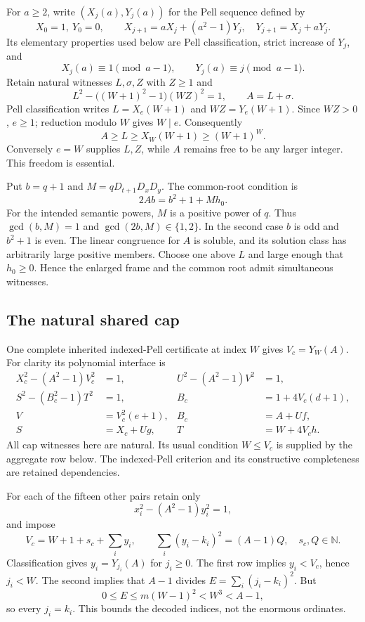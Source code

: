 For $a\ge2$, write $(X_j(a),Y_j(a))$ for the Pell sequence defined by
\[
 X_0=1,\ Y_0=0,\qquad
 X_{j+1}=aX_j+(a^2-1)Y_j,\quad Y_{j+1}=X_j+aY_j.
\]
Its elementary properties used below are Pell classification,
strict increase of $Y_j$, and
\[
 X_j(a)\equiv1\pmod{a-1},\qquad
 Y_j(a)\equiv j\pmod{a-1}.
\]
Retain natural witnesses $L,\sigma,Z$ with $Z\ge1$ and
\begin{equation}
 L^2-\bigl((W+1)^2-1\bigr)(WZ)^2=1,
 \qquad A=L+\sigma.
 \label{eq:direct-large-base}
\end{equation}
Pell classification writes $L=X_e(W+1)$ and $WZ=Y_e(W+1)$.
Since $WZ>0$, $e\ge1$; reduction modulo $W$ gives $W\mid e$.
Consequently
\[
 A\ge L\ge X_W(W+1)\ge(W+1)^W.
\]
Conversely $e=W$ supplies $L,Z$, while $A$ remains free to be any
larger integer. This freedom is essential.

Put $b=q+1$ and $M=qD_{t+1}D_xD_y$. The common-root condition is
\begin{equation}
 2Ab=b^2+1+Mh_0.
 \label{eq:direct-common-root}
\end{equation}
For the intended semantic powers, $M$ is a positive power of $q$.
Thus $\gcd(b,M)=1$ and $\gcd(2b,M)\in\{1,2\}$. In the second case
$b$ is odd and $b^2+1$ is even. The linear congruence for $A$ is
soluble, and its solution class has arbitrarily large positive members.
Choose one above $L$ and large enough that $h_0\ge0$. Hence the
enlarged frame and the common root admit simultaneous witnesses.

\subsection{The natural shared cap}

One complete inherited indexed-Pell certificate at index $W$ gives
$V_c=Y_W(A)$. For clarity its polynomial interface is
\begin{align*}
 X_c^2-(A^2-1)V_c^2&=1,& U^2-(A^2-1)V^2&=1,\\
 S^2-(B_c^2-1)T^2&=1,& B_c&=1+4V_c(d+1),\\
 V&=V_c^2(e+1),&B_c&=A+Uf,\\
 S&=X_c+Ug,&T&=W+4V_ch.
\end{align*}
All cap witnesses here are natural. Its usual condition $W\le V_c$
is supplied by the aggregate row below. The indexed-Pell criterion and
its constructive completeness are retained dependencies.

For each of the fifteen other pairs retain only
\[
 x_i^2-(A^2-1)y_i^2=1,
\]
and impose
\begin{equation}
 V_c=W+1+s_c+\sum_i y_i,
 \qquad \sum_i(y_i-k_i)^2=(A-1)Q,
 \quad s_c,Q\in\mathbb N.
 \label{eq:direct-natural-cap}
\end{equation}
Classification gives $y_i=Y_{j_i}(A)$ for $j_i\ge0$.
The first row implies $y_i<V_c$, hence $j_i<W$.
The second implies that $A-1$ divides
$E=\sum_i(j_i-k_i)^2$. But
\[
 0\le E\le m(W-1)^2<W^3<A-1,
\]
so every $j_i=k_i$. This bounds the decoded indices, not the enormous
ordinates.

